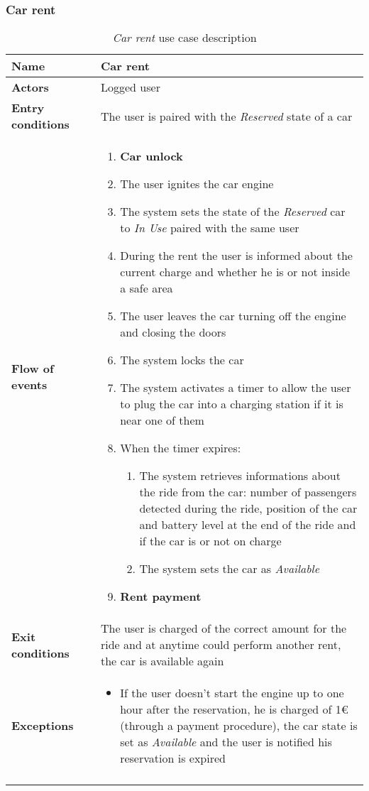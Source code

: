 \subsubsection{Car rent}
\begin{longtable}{p{0.25\linewidth}p{0.75\linewidth}}
\toprule
\textbf{Name} & \textbf{Car rent} \\
\midrule
\textbf{Actors} &  Logged user \\
\midrule
\textbf{Entry conditions} & 
The user is paired with the \emph{Reserved} state of a car\\
\midrule
\textbf{Flow of events} & 
\begin{enumerate}
	\item \textbf{Car unlock}
	\item The user ignites the car engine
	\item The system sets the state of the \emph{Reserved} car to \emph{In Use} paired
	with the same user
	\item During the rent the user is informed about the current charge and whether he is or not inside a safe area
	\item The user leaves the car turning off the engine and closing the doors
	\item The system locks the car
    \item The system activates a timer to allow the user to plug the car into a charging station if it is
    near one of them
    \item When the timer expires:
    	\begin{enumerate}[label = 8.\arabic*]
    		\item The system retrieves informations about the ride from the car: number of passengers detected during the ride, position of the car and battery level at the end of the ride and if the car is or not on charge 
    		\item The system sets the car as \emph{Available}
    	\end{enumerate}
    \item \textbf{Rent payment}
\end{enumerate} \\
\midrule
\textbf{Exit conditions} & 
The user is charged of the correct amount for the ride and at anytime could perform another rent, the car is available again\\
\midrule
\textbf{Exceptions} & 
\begin{itemize}
	\item If the user doesn't start the engine up to one hour after the reservation, he is charged of 1\euro (through a payment procedure), the car state is set as \emph{Available} and the user is notified his reservation is expired
\end{itemize} \\
\bottomrule
\caption{\emph{Car rent} use case description}
\end{longtable}

